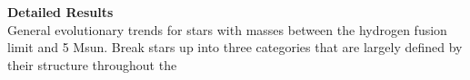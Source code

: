 \textbf{Detailed Results} \\
General evolutionary trends for stars with masses between the hydrogen fusion limit and 5 Msun. Break stars up into three categories that are largely defined by their structure throughout the 